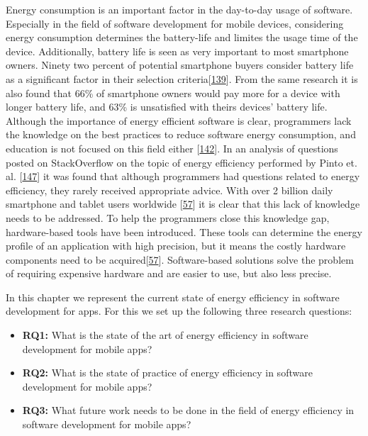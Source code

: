 \documentclass[]{book}
\providecommand{\tightlist}{%
  \setlength{\itemsep}{0pt}\setlength{\parskip}{0pt}}
\begin{document}
Energy consumption is an important factor in the day-to-day usage of
software. Especially in the field of software development for mobile
devices, considering energy consumption determines the battery-life and
limites the usage time of the device. Additionally, battery life is seen
as very important to most smartphone owners. Ninety two percent of
potential smartphone buyers consider battery life as a significant
factor in their selection
criteria{[}\protect\hyperlink{ref-OOC2017}{139}{]}. From the same
research it is also found that 66\% of smartphone owners would pay more
for a device with longer battery life, and 63\% is unsatisfied with
theirs devices' battery life. Although the importance of energy
efficient software is clear, programmers lack the knowledge on the best
practices to reduce software energy consumption, and education is not
focused on this field either {[}\protect\hyperlink{ref-PHA2016}{142}{]}.
In an analysis of questions posted on StackOverflow on the topic of
energy efficiency performed by Pinto et. al.
{[}\protect\hyperlink{ref-PCL2014}{147}{]} it was found that although
programmers had questions related to energy efficiency, they rarely
received appropriate advice. With over 2 billion daily smartphone and
tablet users worldwide {[}\protect\hyperlink{ref-NPPPZL2017}{57}{]} it
is clear that this lack of knowledge needs to be addressed. To help the
programmers close this knowledge gap, hardware-based tools have been
introduced. These tools can determine the energy profile of an
application with high precision, but it means the costly hardware
components need to be
acquired{[}\protect\hyperlink{ref-NPPPZL2017}{57}{]}. Software-based
solutions solve the problem of requiring expensive hardware and are
easier to use, but also less precise.

In this chapter we represent the current state of energy efficiency in
software development for apps. For this we set up the following three
research questions:

\begin{itemize}
\tightlist
\item
  \textbf{RQ1:} What is the state of the art of energy efficiency in
  software development for mobile apps?
\item
  \textbf{RQ2:} What is the state of practice of energy efficiency in
  software development for mobile apps?
\item
  \textbf{RQ3:} What future work needs to be done in the field of energy
  efficiency in software development for mobile apps?
\end{itemize}
\end{document}
